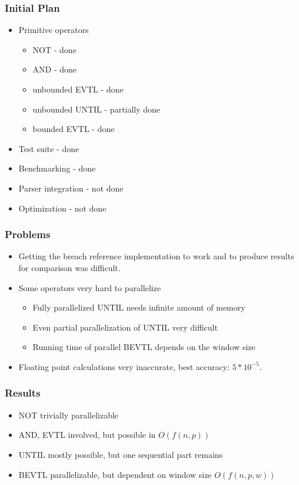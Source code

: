 \documentclass{beamer}
\begin{document}
\begin{frame}
\frametitle{Initial Plan}
\begin{itemize}
\item Primitive operators
\begin{itemize}
\item NOT - done
\item AND - done
\item unbounded EVTL - done
\item unbounded UNTIL - partially done
\item bounded EVTL - done
\end{itemize}
\item Test suite - done
\item Benchmarking - done
\item Parser integration - not done
\item Optimization - not done
\end{itemize}
\end{frame}

\begin{frame}
\frametitle{Problems}
\begin{itemize}
\item Getting the breach reference implementation to work and to produce results for
        comparison was difficult.
\item Some operators very hard to parallelize
\begin{itemize}
\item Fully parallelized UNTIL needs infinite amount of memory
\item Even partial parallelization of UNTIL very difficult
\item Running time of parallel BEVTL depends on the window size
\end{itemize}
\item Floating point calculations very inaccurate, best accuracy: $5*10^{-5}$.
\end{itemize}
\end{frame}

\begin{frame}
\frametitle{Results}
\begin{itemize}
\item NOT trivially parallelizable
\item AND, EVTL involved, but possible in $O(f(n,p))$
\item UNTIL mostly possible, but one sequential part remains
\item BEVTL parallelizable, but dependent on window size $O(f(n,p,w))$
\end{itemize}
\end{frame}
\end{document}
